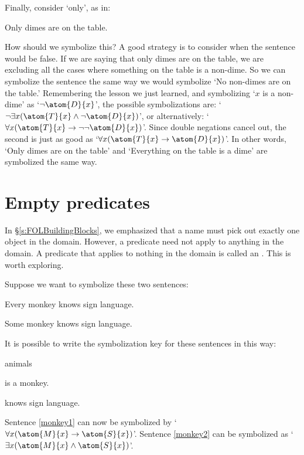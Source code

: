 
Finally, consider `only', as in:
\begin{earg}
	\item[\ex{quan5}] Only dimes are on the table.
\end{earg}
How should we symbolize this?  A good strategy is to consider when the sentence would be false.  If we are saying that only dimes are on the table, we are excluding all the cases where something on the table is a non-dime.  So we can symbolize the sentence the same way we would symbolize `No non-dimes are on the table.' Remembering the lesson we just learned, and symbolizing `$x$ is a non-dime' as `$\enot \atom{D}{x}$', the possible symbolizations are: `$\enot\exists x(\atom{T}{x} \eand \enot \atom{D}{x})$', or alternatively: `$\forall x(\atom{T}{x} \eif \enot\enot \atom{D}{x})$'. Since double negations cancel out, the second is just as good as `$\forall x(\atom{T}{x} \eif \atom{D}{x})$'. In other words, `Only dimes are on the table' and `Everything on the table is a dime' are symbolized the same way.


\section{Empty predicates}

In \S\ref{s:FOLBuildingBlocks}, we emphasized that a name must pick out exactly one object in the domain. However, a predicate need not apply to anything in the domain. A predicate that applies to nothing in the domain is called an . This is worth exploring.


Suppose we want to symbolize these two sentences:
	\begin{earg}
		\item[\ex{monkey1}] Every monkey knows sign language.
		\item[\ex{monkey2}] Some monkey knows sign language.
	\end{earg}
It is possible to write the symbolization key for these sentences in this way:
	\begin{ekey}
		\item[\text{domain}] animals
		\item[\atom{M}{x}]  is a monkey.
		\item[\atom{S}{x}]  knows sign language.
	\end{ekey}
Sentence \ref{monkey1} can now be symbolized by `$\forall x(\atom{M}{x} \eif \atom{S}{x})$'. Sentence \ref{monkey2} can be symbolized as `$\exists x(\atom{M}{x} \eand \atom{S}{x})$'.

